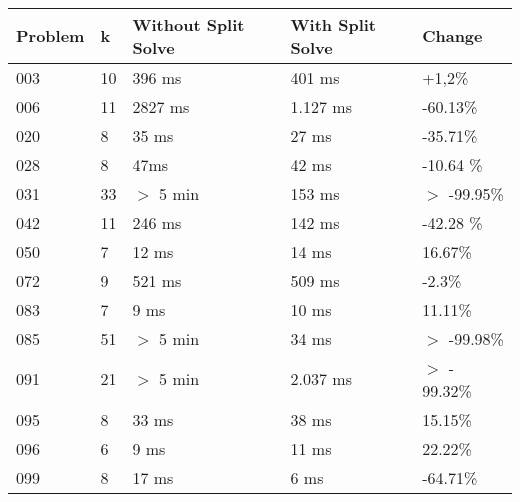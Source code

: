 ~\\\begin{tabular}{|l|l|l|l|l|}
\hline
\textbf{Problem} & \textbf{k} & \textbf{Without Split Solve} & \textbf{With Split Solve} & \textbf{Change} \\
\hline
003 & 10 & 396 ms & 401 ms  & +1,2\% \\
006 & 11 & 2827 ms & 1.127 ms & -60.13\% \\
020 & 8 & 35 ms & 27 ms &  -35.71\% \\
028 & 8  & 47ms & 42 ms & -10.64 \% \\
031 & 33 & $>$ 5 min & 153 ms & $>$ -99.95\% \\
042 & 11 & 246 ms & 142 ms & -42.28 \% \\
050 & 7 & 12 ms & 14 ms & 16.67\% \\
072 & 9 & 521 ms & 509 ms & -2.3\% \\
083 & 7 & 9 ms & 10 ms & 11.11\% \\
085 & 51 & $>$ 5 min & 34 ms & $>$ -99.98\% \\
091 & 21 & $>$ 5 min & 2.037 ms & $>$ - 99.32\% \\
095 & 8 & 33 ms & 38 ms & 15.15\% \\
096 & 6 & 9 ms & 11 ms & 22.22\% \\
099 & 8 & 17 ms & 6 ms & -64.71\% \\
\hline
\end{tabular}
